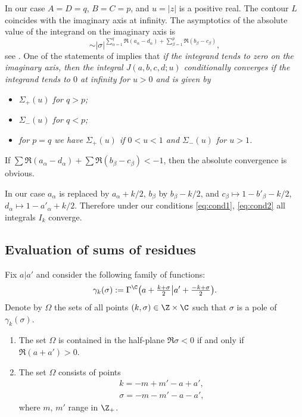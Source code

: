 In our case $A=D=q$, $B=C=p$, and $u=|z|$ is a positive real.
The contour $L$ coincides with the imaginary axis at infinity.
The asymptotics of the absolute value of the integrand on the imaginary axis
is
\[
\sim |\sigma|^{\sum\limits_{\alpha=1}^q\Re (a_\alpha-d_\alpha)+\sum\limits_{\beta=1}^p\Re(b_\beta- c_\beta)},
\]
see \cite[equation~(1.18(4))]{HTF1}.
One of the statements of \cite[Theorem~18]{Mar} implies that
\emph{if the integrand tends to zero on the imaginary axis,
then the integral $J(a,b,c,d;u)$ conditionally converges if
the integrand tends to $0$ at infinity for $u>0$ and is given by}
\begin{itemize}\itemsep=0pt
\item[--] \textit{$\Sigma_+(u)$ for $q>p$;}
\item[--] \textit{$\Sigma_-(u)$ for $q<p$;}
\item[--] \textit{for $p=q$ we have $\Sigma_+(u)$ if $0<u<1$ and $\Sigma_-(u)$ for $u>1$.}
\end{itemize}
If
$\sum\Re(a_\alpha-d_\alpha)+\sum\Re(b_\beta-c_\beta)<-1$,
then the absolute convergence is obvious.

In our case $a_\alpha$ is replaced by $a_\alpha+k/2$, $b_\beta$ by
$b_\beta-k/2$, and $c_\beta\mapsto 1-b'_\beta-k/2$,
$d_\alpha\mapsto 1-a'_\alpha+k/2$.
Therefore under our conditions \eqref{eq:cond1}, \eqref{eq:cond2}
all integrals $I_k$ converge.

\subsection{Evaluation of sums of residues}\label{ss:evaluation}

\begin{Lemma}
Fix $a|a'$ and consider the following family of functions:
\[
\gamma_k(\sigma):=\Gamma^\C\big(a+\tfrac {k+\sigma}2\big|a'+\tfrac
{-k+\sigma}2\big).
\]
Denote by $\Omega$ the sets of all points $(k,\sigma)\in \Z\times \C$
such that $\sigma$ is a pole of $\gamma_k(\sigma)$.
\begin{enumerate}\itemsep=0pt
\item[$(a)$] The set $\Omega$ is contained in the half-plane $\Re\sigma<0$ if and only
if $\Re(a+a')>0$.
\item[$(b)$] The set $\Omega$ consists of points
\begin{gather*}
k=-m+m'-a+a', \\
\sigma= -m-m'-a-a',
\end{gather*}
where $m$, $m'$ range in $\Z_+$.
\end{enumerate}
\end{Lemma}

